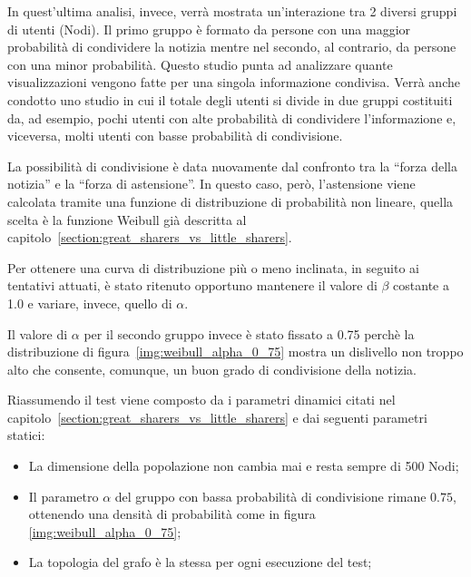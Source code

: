In quest'ultima analisi, invece, verrà mostrata un'interazione tra 2 diversi gruppi di utenti (Nodi).
Il primo gruppo è formato da persone con una maggior probabilità di condividere la notizia 
mentre nel secondo, al contrario, da persone con una minor probabilità.
Questo studio punta ad analizzare quante visualizzazioni vengono fatte per una singola informazione condivisa.
Verrà anche condotto uno studio in cui il totale degli utenti si divide in due gruppi costituiti da, ad esempio, 
pochi utenti con alte probabilità di condividere l'informazione e, viceversa, 
molti utenti con basse probabilità di condivisione.

La possibilità di condivisione è data nuovamente dal confronto tra la ``forza della notizia'' e la ``forza di astensione''. 
In questo caso, però, l'astensione viene calcolata tramite una funzione di distribuzione di probabilità non lineare,
quella scelta è la funzione Weibull già descritta al capitolo~\ref{section:great_sharers_vs_little_sharers}.

Per ottenere una curva di distribuzione più o meno inclinata, in seguito ai tentativi attuati, 
è stato ritenuto opportuno mantenere il valore di $\beta$ costante a 1.0 e variare, invece, quello di $\alpha$.

Il valore di $\alpha$ per il secondo gruppo invece è stato fissato a 0.75 perchè 
la distribuzione di figura~\ref{img:weibull_alpha_0_75} mostra un dislivello non troppo 
alto che consente, comunque, un buon grado di condivisione della notizia.

Riassumendo il test viene composto da i parametri dinamici citati nel 
capitolo~\ref{section:great_sharers_vs_little_sharers} e dai seguenti parametri statici:
\begin{itemize}
\item La dimensione della popolazione non cambia mai e resta sempre di 500 Nodi;
\item Il parametro $\alpha$ del gruppo con bassa probabilità di condivisione rimane $0.75$, 
ottenendo una densità di probabilità come in figura \ref{img:weibull_alpha_0_75};
\item La topologia del grafo è la stessa per ogni esecuzione del test;
\end{itemize}


